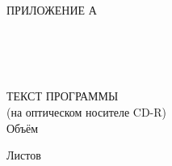 \begin{ESKDtitlePage}
  \begin{flushright}
    ПРИЛОЖЕНИЕ А \enspace
  \end{flushright}
  
  \begin{center}
    \envDiplomEducation \\
    \envDiplomUniversity \\
    \envDiplomCathedra \\
  \end{center}

  \vfill

  \begin{center}
    ТЕКСТ ПРОГРАММЫ \\
    (на оптическом носителе CD-R) \\
    Объём~\envDiplomDiskSize \\
  \end{center}

  \vfill

  \begin{center}
    \envCode

    Листов \pageref{LastPage}
  \end{center}

  \vfill

  

  \vfill

  \begin{center}
    \ESKDtheYear
  \end{center}
\end{ESKDtitlePage}
